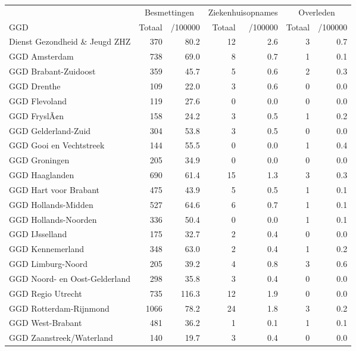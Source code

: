 \documentclass[
  english,
  man,floatsintext]{apa6}
\begin{document}
\begin{table}
\centering\begingroup\fontsize{10}{12}\selectfont

\begin{threeparttable}
\begin{tabular}{lrrrrrr}
\toprule
\multicolumn{1}{c}{ } & \multicolumn{2}{c}{Besmettingen} & \multicolumn{2}{c}{Ziekenhuisopnames} & \multicolumn{2}{c}{Overleden} \\
\cmidrule(l{3pt}r{3pt}){2-3} \cmidrule(l{3pt}r{3pt}){4-5} \cmidrule(l{3pt}r{3pt}){6-7}
GGD & Totaal & /100000 & Totaal & /100000 & Totaal & /100000\\
\midrule
Dienst Gezondheid \& Jeugd ZHZ & 370 & 80.2 & 12 & 2.6 & 3 & 0.7\\
GGD Amsterdam & 738 & 69.0 & 8 & 0.7 & 1 & 0.1\\
GGD Brabant-Zuidoost & 359 & 45.7 & 5 & 0.6 & 2 & 0.3\\
GGD Drenthe & 109 & 22.0 & 3 & 0.6 & 0 & 0.0\\
GGD Flevoland & 119 & 27.6 & 0 & 0.0 & 0 & 0.0\\
GGD FryslÃ¢n & 158 & 24.2 & 3 & 0.5 & 1 & 0.2\\
GGD Gelderland-Zuid & 304 & 53.8 & 3 & 0.5 & 0 & 0.0\\
GGD Gooi en Vechtstreek & 144 & 55.5 & 0 & 0.0 & 1 & 0.4\\
GGD Groningen & 205 & 34.9 & 0 & 0.0 & 0 & 0.0\\
GGD Haaglanden & 690 & 61.4 & 15 & 1.3 & 3 & 0.3\\
GGD Hart voor Brabant & 475 & 43.9 & 5 & 0.5 & 1 & 0.1\\
GGD Hollands-Midden & 527 & 64.6 & 6 & 0.7 & 1 & 0.1\\
GGD Hollands-Noorden & 336 & 50.4 & 0 & 0.0 & 1 & 0.1\\
GGD IJsselland & 175 & 32.7 & 2 & 0.4 & 0 & 0.0\\
GGD Kennemerland & 348 & 63.0 & 2 & 0.4 & 1 & 0.2\\
GGD Limburg-Noord & 205 & 39.2 & 4 & 0.8 & 3 & 0.6\\
GGD Noord- en Oost-Gelderland & 298 & 35.8 & 3 & 0.4 & 0 & 0.0\\
GGD Regio Utrecht & 735 & 116.3 & 12 & 1.9 & 0 & 0.0\\
GGD Rotterdam-Rijnmond & 1066 & 78.2 & 24 & 1.8 & 3 & 0.2\\
GGD West-Brabant & 481 & 36.2 & 1 & 0.1 & 1 & 0.1\\
GGD Zaanstreek/Waterland & 140 & 19.7 & 3 & 0.4 & 0 & 0.0\\

\end{tabular}
\end{threeparttable}
\end{table}
\end{document}
